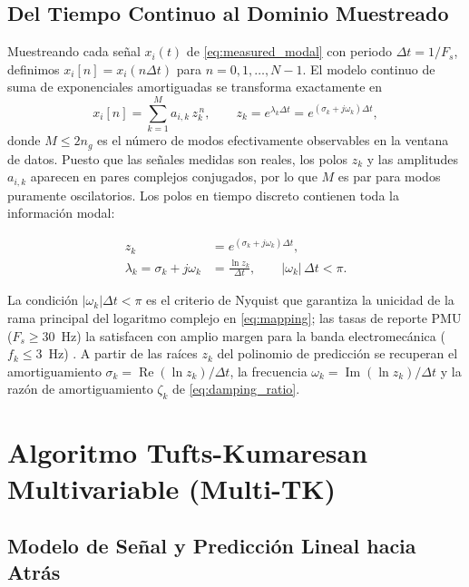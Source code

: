 \subsection{Del Tiempo Continuo al Dominio Muestreado}

Muestreando cada señal $x_i(t)$ de \eqref{eq:measured_modal} con periodo
$\Delta t = 1/F_s$, definimos $x_i[n] = x_i(n\Delta t)$ para
$n = 0,1,\dots,N-1$. El modelo continuo de suma de exponenciales
amortiguadas se transforma exactamente en
\begin{equation}
    x_i[n] = \sum_{k=1}^{M} a_{i,k}\, z_k^{\,n}, \qquad
    z_k = e^{\lambda_k \Delta t} = e^{(\sigma_k + j\omega_k)\Delta t},
    \label{eq:discrete}
\end{equation}
donde $M \le 2n_g$ es el número de modos efectivamente observables en la
ventana de datos. Puesto que las señales medidas son reales, los polos
$z_k$ y las amplitudes $a_{i,k}$ aparecen en pares complejos conjugados,
por lo que $M$ es par para modos puramente oscilatorios. Los polos en
tiempo discreto contienen toda la información modal:

\begin{align}
    z_k &= e^{(\sigma_k + j\omega_k)\Delta t}, \\[4pt]
    \lambda_k = \sigma_k + j\omega_k &= \frac{\ln z_k}{\Delta t},
    \qquad |\omega_k|\,\Delta t < \pi .
    \label{eq:mapping}
\end{align}

La condición $|\omega_k|\Delta t < \pi$ es el criterio de Nyquist que
garantiza la unicidad de la rama principal del logaritmo complejo en
\eqref{eq:mapping}; las tasas de reporte PMU ($F_s \ge 30$~Hz) la
satisfacen con amplio margen para la banda electromecánica
($f_k \le 3$~Hz) \cite{sauer2017}. A partir de las raíces $z_k$ del
polinomio de predicción se recuperan el amortiguamiento
$\sigma_k = \operatorname{Re}(\ln z_k)/\Delta t$, la frecuencia
$\omega_k = \operatorname{Im}(\ln z_k)/\Delta t$ y la razón de
amortiguamiento $\zeta_k$ de \eqref{eq:damping_ratio}.

\section{Algoritmo Tufts-Kumaresan Multivariable (Multi-TK)}

\subsection{Modelo de Señal y Predicción Lineal hacia Atrás}

